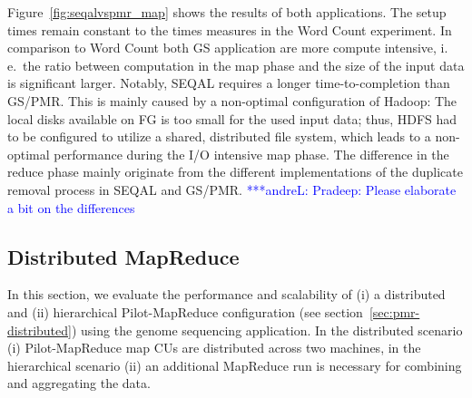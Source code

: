 \documentclass{acm_proc_article-sp}
\newcommand{\alnote}[1]{ {\textcolor{blue} { ***andreL: #1 }}}
\newcommand{\pnote}[1]{ {\textcolor{magenta} { ***pradeep: #1 }}}
\newcommand{\alnote}[1]{}
\newcommand{\pnote}[1]{}
\newcommand{\pilotmapreduce}{Pilot-MapReduce\xspace}
\begin{document}
Figure~\ref{fig:seqalvspmr_map} shows the results of both applications. The
setup times remain constant to the times measures in the Word Count experiment.
In comparison to Word Count both GS application are more compute intensive,
i.\,e.\ the ratio between computation in the map phase and the size of the input
data is significant larger. Notably, SEQAL requires a longer time-to-completion
than GS/PMR. This is mainly caused by a non-optimal configuration of Hadoop: The
local disks available on FG is too small for the used input data; thus, HDFS had
to be configured to utilize a shared, distributed file system, which leads to a
non-optimal performance during the I/O intensive map phase. The difference in
the reduce phase mainly originate from the different implementations of the
duplicate removal process in SEQAL and GS/PMR.
\alnote{Pradeep: Please elaborate a bit on the differences}




\subsection{Distributed MapReduce}

In this section, we evaluate the performance and scalability of (i) a 
distributed and (ii) hierarchical \pilotmapreduce configuration (see
section~\ref{sec:pmr-distributed}) using the genome sequencing application.
In the distributed scenario (i) \pilotmapreduce map CUs are distributed across 
two machines, in the  hierarchical scenario (ii) an additional MapReduce run is 
necessary for combining and aggregating the data.
\end{document}
